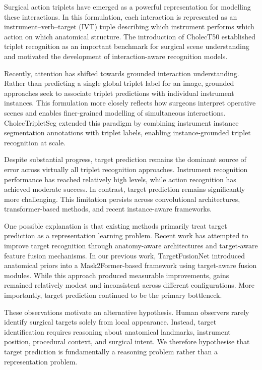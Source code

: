 \documentclass[11pt]{article}
\begin{document}
Surgical action triplets have emerged as a powerful representation for modelling these interactions. In this formulation, each interaction is represented as an instrument--verb--target (IVT) tuple describing which instrument performs which action on which anatomical structure. The introduction of CholecT50 established triplet recognition as an important benchmark for surgical scene understanding and motivated the development of interaction-aware recognition models.

Recently, attention has shifted towards grounded interaction understanding. Rather than predicting a single global triplet label for an image, grounded approaches seek to associate triplet predictions with individual instrument instances. This formulation more closely reflects how surgeons interpret operative scenes and enables finer-grained modelling of simultaneous interactions. CholecTripletSeg extended this paradigm by combining instrument instance segmentation annotations with triplet labels, enabling instance-grounded triplet recognition at scale.

Despite substantial progress, target prediction remains the dominant source of error across virtually all triplet recognition approaches. Instrument recognition performance has reached relatively high levels, while action recognition has achieved moderate success. In contrast, target prediction remains significantly more challenging. This limitation persists across convolutional architectures, transformer-based methods, and recent instance-aware frameworks.

One possible explanation is that existing methods primarily treat target prediction as a representation learning problem. Recent work has attempted to improve target recognition through anatomy-aware architectures and target-aware feature fusion mechanisms. In our previous work, TargetFusionNet introduced anatomical priors into a Mask2Former-based framework using target-aware fusion modules. While this approach produced measurable improvements, gains remained relatively modest and inconsistent across different configurations. More importantly, target prediction continued to be the primary bottleneck.

These observations motivate an alternative hypothesis. Human observers rarely identify surgical targets solely from local appearance. Instead, target identification requires reasoning about anatomical landmarks, instrument position, procedural context, and surgical intent. We therefore hypothesise that target prediction is fundamentally a reasoning problem rather than a representation problem.
\end{document}
